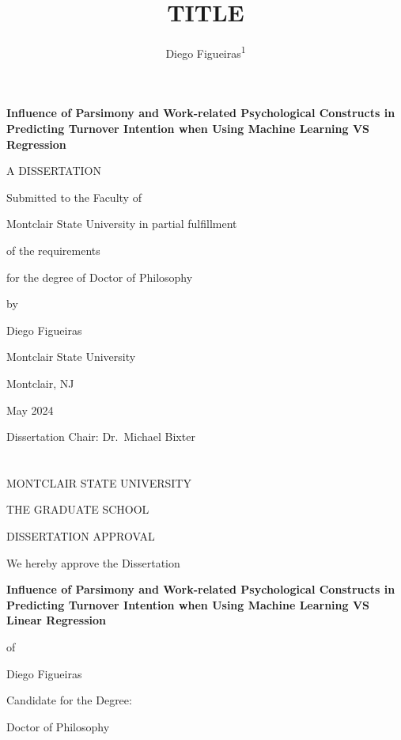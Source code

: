 \documentclass[
  man]{apa7}
\title{TITLE}
\author{Diego Figueiras\textsuperscript{1}}
\date{}
\affiliation{\vspace{0.5cm}\textsuperscript{1} Montclai State University}
\begin{document}
\maketitle

\thispagestyle{empty}
\newpage

\renewcommand{\headrulewidth}{0pt}
\renewcommand{\footrulewidth}{0pt}
\phantom{i'm a ghost}
\vskip 1.0in
\begin{center}

\textbf{Influence of Parsimony and Work-related Psychological Constructs in Predicting Turnover Intention when Using Machine Learning VS Regression}

\vskip 0.8in

A DISSERTATION

\vskip 0.8in

Submitted to the Faculty of

Montclair State University in partial fulfillment

of the requirements

for the degree of Doctor of Philosophy

\vskip 0.4in

by

Diego Figueiras

Montclair State University

Montclair, NJ

May 2024

\end{center}

\vskip 1.0in

Dissertation Chair: Dr.~Michael Bixter

\newpage

\section{}
\cfoot{}
\rhead{\thepage}

\renewcommand{\headrulewidth}{0pt}
\renewcommand{\footrulewidth}{0pt}

\onehalfspacing

\begin{center}

MONTCLAIR STATE UNIVERSITY

THE GRADUATE SCHOOL

DISSERTATION APPROVAL

\vskip 0.2in

We hereby approve the Dissertation

\vskip 0.2in

\textbf{Influence of Parsimony and Work-related Psychological Constructs in Predicting Turnover Intention when Using Machine Learning VS Linear Regression}

of

Diego Figueiras

Candidate for the Degree:

Doctor of Philosophy

\end{center}
\end{document}
